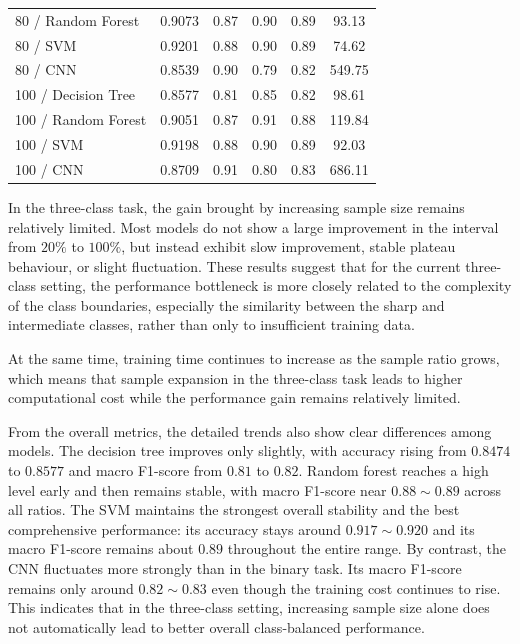 \begin{table}[H]
\begin{tabular}{lccccc}
        80 / Random Forest & 0.9073 & 0.87 & 0.90 & 0.89 & 93.13 \\
        80 / SVM           & 0.9201 & 0.88 & 0.90 & 0.89 & 74.62 \\
        80 / CNN           & 0.8539 & 0.90 & 0.79 & 0.82 & 549.75 \\
        100 / Decision Tree & 0.8577 & 0.81 & 0.85 & 0.82 & 98.61 \\
        100 / Random Forest & 0.9051 & 0.87 & 0.91 & 0.88 & 119.84 \\
        100 / SVM           & 0.9198 & 0.88 & 0.90 & 0.89 & 92.03 \\
        100 / CNN           & 0.8709 & 0.91 & 0.80 & 0.83 & 686.11 \\
        \bottomrule
    \end{tabular}
\end{table}

\par In the three-class task, the gain brought by increasing sample size
remains relatively limited. Most models do not show a large improvement in the
interval from $20\%$ to $100\%$, but instead exhibit slow improvement, stable
plateau behaviour, or slight fluctuation. These results suggest that for the
current three-class setting, the performance bottleneck is more closely related
to the complexity of the class boundaries, especially the similarity between
the sharp and intermediate classes, rather than only to insufficient training
data.

\par At the same time, training time continues to increase as the sample ratio
grows, which means that sample expansion in the three-class task leads to
higher computational cost while the performance gain remains relatively
limited.

\par From the overall metrics, the detailed trends also show clear differences
among models. The decision tree improves only slightly, with accuracy rising
from $0.8474$ to $0.8577$ and macro F1-score from $0.81$ to $0.82$. Random
forest reaches a high level early and then remains stable, with macro F1-score
near $0.88\sim0.89$ across all ratios. The SVM maintains the strongest overall
stability and the best comprehensive performance: its accuracy stays around
$0.917\sim0.920$ and its macro F1-score remains about $0.89$ throughout the
entire range. By contrast, the CNN fluctuates more strongly than in the binary
task. Its macro F1-score remains only around $0.82\sim0.83$ even though the
training cost continues to rise. This indicates that in the three-class
setting, increasing sample size alone does not automatically lead to better
overall class-balanced performance.

